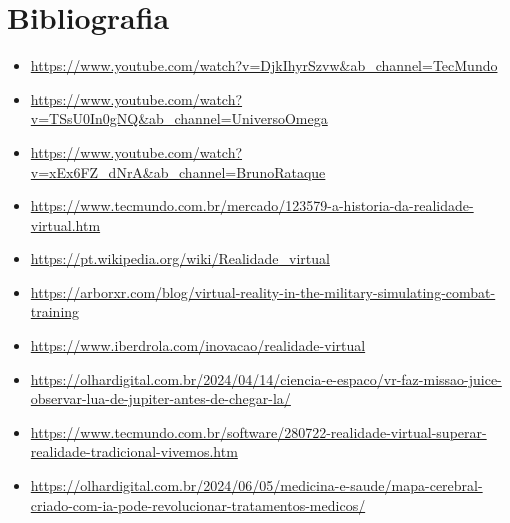 \documentclass[article,a4paper,12pt,brazil,sumario=tradicional]{abntex2}
\begin{document}
\section{Bibliografia}
\begin{itemize}
    \item \href{https://www.youtube.com/watch?v=DjkIhyrSzvw\&ab_channel=TecMundo}{https://www.youtube.com/watch?v=DjkIhyrSzvw\&ab\_channel=TecMundo}
    \item \href{https://www.youtube.com/watch?v=TSsU0In0gNQ\&ab_channel=UniversoOmega}{https://www.youtube.com/watch?v=TSsU0In0gNQ\&ab\_channel=UniversoOmega}
    \item \href{https://www.youtube.com/watch?v=xEx6FZ_dNrA\&ab_channel=BrunoRataque}{https://www.youtube.com/watch?v=xEx6FZ\_dNrA\&ab\_channel=BrunoRataque}
    \item \href{https://www.tecmundo.com.br/mercado/123579-a-historia-da-realidade-virtual.htm}{https://www.tecmundo.com.br/mercado/123579-a-historia-da-realidade-virtual.htm}
    \item \href{https://pt.wikipedia.org/wiki/Realidade_virtual}{https://pt.wikipedia.org/wiki/Realidade\_virtual}
    \item \href{https://arborxr.com/blog/virtual-reality-in-the-military-simulating-combat-training/%7D%7B}{https://arborxr.com/blog/virtual-reality-in-the-military-simulating-combat-training}
    \item \href{https://www.iberdrola.com/inovacao/realidade-virtual}{https://www.iberdrola.com/inovacao/realidade-virtual}
    \item \href{https://olhardigital.com.br/2024/04/14/ciencia-e-espaco/vr-faz-missao-juice-observar-lua-de-jupiter-antes-de-chegar-la/}{https://olhardigital.com.br/2024/04/14/ciencia-e-espaco/vr-faz-missao-juice-observar-lua-de-jupiter-antes-de-chegar-la/}
    \item \href{https://www.tecmundo.com.br/software/280722-realidade-virtual-superar-realidade-tradicional-vivemos.htm}{https://www.tecmundo.com.br/software/280722-realidade-virtual-superar-realidade-tradicional-vivemos.htm}
    \item \href{https://olhardigital.com.br/2024/06/05/medicina-e-saude/mapa-cerebral-criado-com-ia-pode-revolucionar-tratamentos-medicos/}{https://olhardigital.com.br/2024/06/05/medicina-e-saude/mapa-cerebral-criado-com-ia-pode-revolucionar-tratamentos-medicos/}

\end{itemize}
\end{document}

